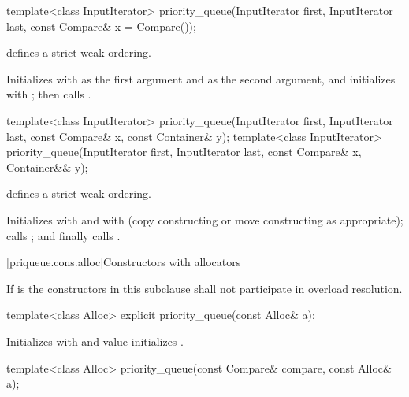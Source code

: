 %
\begin{itemdecl}
template<class InputIterator>
  priority_queue(InputIterator first, InputIterator last, const Compare& x = Compare());
\end{itemdecl}

\begin{itemdescr}
\pnum
\expects
{} defines a strict weak ordering.

\pnum
\effects
Initializes  with
 as the first argument and
 as the second argument, and
initializes  with ;
then calls .
\end{itemdescr}

%
\begin{itemdecl}
template<class InputIterator>
  priority_queue(InputIterator first, InputIterator last, const Compare& x, const Container& y);
template<class InputIterator>
  priority_queue(InputIterator first, InputIterator last, const Compare& x, Container&& y);
\end{itemdecl}

\begin{itemdescr}
\pnum
\expects
{} defines a strict weak ordering.

\pnum
\effects
Initializes
 with
 and
 with
 (copy constructing or move constructing as appropriate);
calls
;
and finally calls
.
\end{itemdescr}

[priqueue.cons.alloc]{Constructors with allocators}

\pnum
If  is 
the constructors in this subclause shall not participate in overload resolution.

%
\begin{itemdecl}
template<class Alloc> explicit priority_queue(const Alloc& a);
\end{itemdecl}

\begin{itemdescr}
\pnum
\effects
Initializes  with  and value-initializes .
\end{itemdescr}

%
\begin{itemdecl}
template<class Alloc> priority_queue(const Compare& compare, const Alloc& a);
\end{itemdecl}

